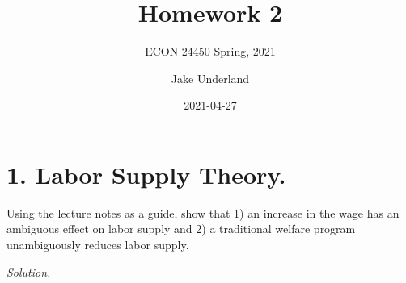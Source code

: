 \documentclass[
]{article}
\title{Homework 2}
\subtitle{ECON 24450 Spring, 2021}
\author{Jake Underland}
\date{2021-04-27}
\begin{document}
\maketitle

{
\setcounter{tocdepth}{2}
\tableofcontents
}
\newcommand{\argmax}{\mathop{\mathrm{argmax}}}

\hypertarget{labor-supply-theory.}{%
\section{1. Labor Supply Theory.}\label{labor-supply-theory.}}

Using the lecture notes as a guide, show that 1) an increase in the wage
has an ambiguous effect on labor supply and 2) a traditional welfare
program unambiguously reduces labor supply.

\textit{Solution.}
\end{document}
